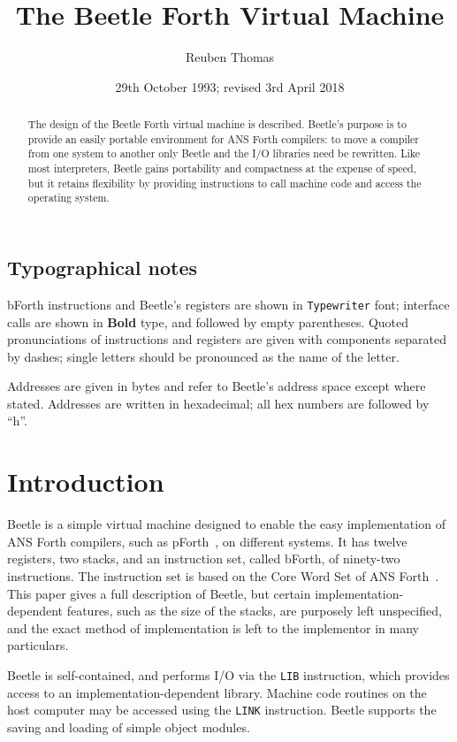 \documentclass{article}
\title{The Beetle Forth Virtual Machine}
\author{Reuben Thomas}
\date{29th October 1993; revised 3rd April 2018}
\newlength{\pronunc}\pronunc=1.7in
\begin{document}
\maketitle

\begin{abstract}
\noindent The design of the Beetle Forth virtual machine is described.
Beetle's purpose is to provide an easily portable environment for ANS Forth
compilers: to move a compiler from one system to another only Beetle and the I/O
libraries need be rewritten. Like most interpreters, Beetle gains portability
and compactness at the expense of speed, but it retains flexibility by providing
instructions to call machine code and access the operating system.
\end{abstract}


\subsection*{Typographical notes}

bForth instructions and Beetle's registers are shown in {\tt Typewriter} font;
interface calls are shown in {\bf Bold} type, and followed by empty parentheses.
Quoted pronunciations of instructions and registers are given with components
separated by dashes; single letters should be pronounced as the name of the
letter.

Addresses are given in bytes and refer to Beetle's address space except where
stated. Addresses are written in hexadecimal; all hex numbers are followed by
``h''.


\section{Introduction}

Beetle is a simple virtual machine designed to enable the easy implementation
of ANS Forth compilers, such as pForth~\cite{beetledis}, on different systems.
It has twelve registers, two stacks, and an instruction set, called bForth, of
ninety-two instructions. The instruction set is based on the Core Word Set of
ANS Forth~\cite{ANSIforth}. This paper gives a full description of Beetle, but
certain implementation-dependent features, such as the size of the stacks, are
purposely left unspecified, and the exact method of implementation is left to
the implementor in many particulars.

Beetle is self-contained, and performs I/O via the {\tt LIB} instruction, which
provides access to an implementation-dependent library. Machine
code routines on the host computer may be accessed using the {\tt LINK}
instruction. Beetle supports the saving and loading of simple object modules.
\end{document}
